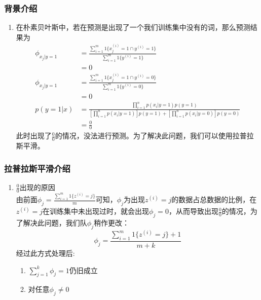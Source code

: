 \subsubsection{背景介绍}
\begin{enumerate}
	\item 在朴素贝叶斯中，若在预测是出现了一个我们训练集中没有的词，那么预测结果为
	\begin{align}
		\phi_{{x_j}|y=1} &= \frac{\sum_{i=1}^{m}1\{x_j^{(i)}=1 \cap y^{(i)}=1\}}{\sum_{i=1}^{m}1\{y^{(i)}=1\}} \\
		&= 0 \\
		\phi_{{x_j}|y=1} &= \frac{\sum_{i=1}^{m}1\{x_j^{(i)}=1 \cap y^{(i)}=0\}}{\sum_{i=1}^{m}1\{y^{(i)}=0\}} \\
		&= 0 \\
		p(y=1|x) &= \frac{\prod_{i=1}^{n}p(x_i|y=1)p(y=1)}{\left[\prod_{i=1}^{n}p(x_i|y=1)\right]p(y=1)+\left[\prod_{i=1}^{n}p(x_i|y=0)\right]p(y=0)} \\
		&= \frac{0}{0}
	\end{align}
	此时出现了$\frac{0}{0}$的情况，没法进行预测。为了解决此问题，我们可以使用拉普拉斯平滑。
\end{enumerate}

\subsubsection{拉普拉斯平滑介绍}
\begin{enumerate}
	\item $\frac{0}{0}$出现的原因 \\
	由前面$\phi_j = \frac{\sum_{i=1}^{m}1\{z^{(i)}=j\}}{m}$可知，$\phi_j$为出现$z^{(i)}=j$的数据占总数据的比例，在$z^{(i)}=j$在训练集中未出现过时，就会出现$\phi_j=0$，从而导致出现$\frac{0}{0}$的情况，为了解决此问题，我们队$\phi_j$稍作更改：
	\begin{equation}
		\phi_j = \frac{\sum_{i=1}^{m}1\{z^{(i)}=j\}+1}{m+k}
	\end{equation}
	经过此方式处理后:
	\begin{enumerate}
		\item $\sum_{j=1}^{k}\phi_j = 1$仍旧成立
		\item 对任意$\phi_j \neq 0$
	\end{enumerate}
\end{enumerate}













